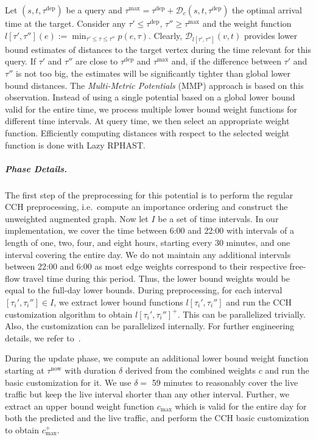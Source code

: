\documentclass[a4paper,UKenglish,cleveref, autoref, thm-restate,anonymous]{lipics-v2021}
\newcommand*{\pred}{p}
\newcommand*{\comb}{c}
\newcommand*{\dist}{\mathcal{D}}
\newcommand*{\tdep}{\tau^{\operatorname{dep}}}
\newcommand*{\tnow}{\tau^{\operatorname{now}}}
\newcommand*{\tmax}{\tau^{\max}}
\begin{document}
Let $(s,t,\tdep)$ be a query and $\tmax = \tdep + \dist_c(s,t,\tdep)$ the optimal arrival time at the target.
Consider any $\tau' \leq \tdep$, $\tau'' \geq \tmax$ and the weight function $l[\tau', \tau''](e) := \min_{\tau' \leq \tau \leq \tau''}\pred(e, \tau)$. %
Clearly, $\dist_{l[\tau', \tau'']}(v,t)$ provides lower bound estimates of distances to the target vertex during the time relevant for this query.
If $\tau'$ and $\tau''$ are close to $\tdep$ and $\tmax$ and, if the difference between $\tau'$ and $\tau''$ is not too big, the estimates will be significantly tighter than global lower bound distances.
The \emph{Multi-Metric Potentials} (MMP) approach is based on this observation.
Instead of using a single potential based on a global lower bound valid for the entire time, we process multiple lower bound weight functions for different time intervals.
At query time, we then select an appropriate weight function.
Efficiently computing distances with respect to the selected weight function is done with Lazy RPHAST.

\subparagraph{Phase Details.}
The first step of the preprocessing for this potential is to perform the regular CCH preprocessing, i.e.\ compute an importance ordering and construct the unweighted augmented graph.
Now let $I$ be a set of time intervals.
In our implementation,
we cover the time between 6:00 and 22:00 with intervals of a length of one, two, four, and eight hours, starting every 30 minutes,
and one interval covering the entire day.
We do not maintain any additional intervals between 22:00 and 6:00 as most edge weights correspond to their respective free-flow travel time during this period.
Thus, the lower bound weights would be equal to the full-day lower bounds.
During preprocessing, for each interval $[\tau_i', \tau_i''] \in I$, we extract lower bound functions $l[\tau_i', \tau_i'']$ and run the CCH customization algorithm to obtain $l[\tau_i', \tau_i'']^+$.
This can be parallelized trivially.
Also, the customization can be parallelized internally.
For further engineering details, we refer to~\cite{dsw-cch-15,bsw-rttau-19,ghuw-fbndocch-19}.

During the update phase, we compute an additional lower bound weight function starting at $\tnow$ with duration $\delta$ derived from the combined weights $\comb$ and run the basic customization for it.
We use $\delta =$ 59 minutes to reasonably cover the live traffic but keep the live interval shorter than any other interval.
Further, we extract an upper bound weight function $\comb_{\max}$ which is valid for the entire day for both the predicted and the live traffic, and perform the CCH basic customization to obtain $\comb^+_{\max}$.
\end{document}
